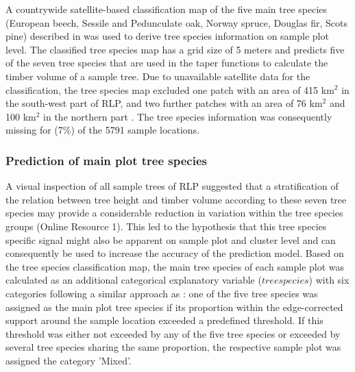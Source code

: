 A countrywide satellite-based classification map of the five main tree species (European beech, Sessile and Pedunculate oak, Norway spruce, Douglas fir, Scots pine) described in \citet{stoffels2015} was used to derive tree species information on sample plot level. The classified tree species map has a grid size of 5 meters and predicts five of the seven tree species that are used in the \bwi{} taper functions \citep{kublin2013} to calculate the timber volume of a sample tree. Due to unavailable satellite data for the classification, the tree species map excluded one patch with an area of 415 km$^2$ in the south-west part of RLP, and two further patches with an area of 76 km$^2$ and 100 km$^2$ in the northern part \citep{stoffels2015}. The tree species information was consequently missing for  (7\%) of the 5791 sample locations.

\subsubsection*{Prediction of main plot tree species}

A visual inspection of all \bwi{} sample trees of RLP suggested that a stratification of the relation between tree height and timber volume according to these seven tree species may provide a considerable reduction in variation within the tree species groups (Online Resource 1). This led to the hypothesis that this tree species specific signal might also be apparent on sample plot and cluster level and can consequently be used to increase the accuracy of the prediction model. Based on the tree species classification map, the main tree species of each sample plot was calculated as an additional categorical explanatory variable ($treespecies$) with six categories following a similar approach as \citet{latifi2012}: one of the five tree species was assigned as the main plot tree species if its proportion within the edge-corrected support around the sample location exceeded a predefined threshold. If this threshold was either not exceeded by any of the five tree species or exceeded by several tree species sharing the same proportion, the respective sample plot was assigned the category 'Mixed'. \par


